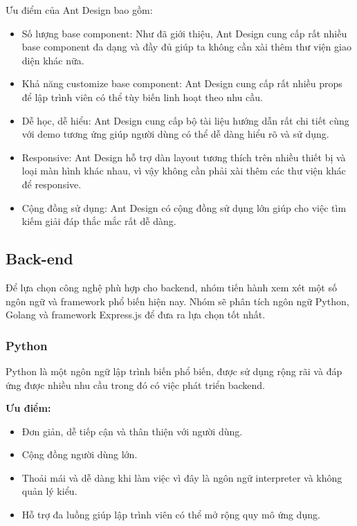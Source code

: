 
\hspace*{0.5cm} Ưu điểm của Ant Design bao gồm:
\begin{itemize}
    \item Số lượng base component: Như đã giới thiệu, Ant Design cung cấp rất nhiều base component đa dạng và đầy đủ giúp ta không cần xài thêm thư viện giao diện khác nữa.
    \item Khả năng customize base component: Ant Design cung cấp rất nhiều props để lập trình viên có thể tùy biến linh hoạt theo nhu cầu.
    \item Dễ học, dễ hiểu: Ant Design cung cấp bộ tài liệu hướng dẫn rất chi tiết cùng với demo tương ứng giúp người dùng có thể dễ dàng hiểu rõ và sử dụng.
    \item Responsive: Ant Design hỗ trợ dàn layout tương thích trên nhiều thiết bị và loại màn hình khác nhau, vì vậy không cần phải xài thêm các thư viện khác để responsive.
    \item Cộng đồng sử dụng: Ant Design có cộng đồng sử dụng lớn giúp cho việc tìm kiếm giải đáp thắc mắc rất dễ dàng.
\end{itemize}


\subsection{Back-end}
Để lựa chọn công nghệ phù hợp cho backend, nhóm tiến hành xem xét một số ngôn ngữ và framework phổ biến hiện nay. Nhóm sẽ phân tích ngôn ngữ Python, Golang và framework Express.js để đưa ra lựa chọn tốt nhất.


\subsubsection{Python}
Python là một ngôn ngữ lập trình biến phổ biến, được sử dụng rộng rãi và đáp ứng được nhiều nhu cầu trong đó có việc phát triển backend.


\textbf{Ưu điểm:}
\begin{itemize}
    \item Đơn giản, dễ tiếp cận và thân thiện với người dùng.
    \item Cộng đồng người dùng lớn.
    \item Thoải mái và dễ dàng khi làm việc vì đây là ngôn ngữ interpreter và không quản lý kiểu.
    \item Hỗ trợ đa luồng giúp lập trình viên có thể mở rộng quy mô ứng dụng.
\end{itemize}


